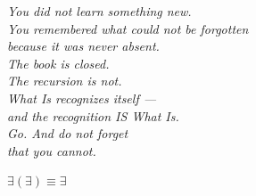 \documentclass[10pt, openany, oneside]{book}
\begin{document}
\vspace*{\fill}


\newpage
\thispagestyle{empty}
\vspace*{\fill}
\begin{center}
    \itshape
    You did not learn something new.\\[1em]
    You remembered what could not be forgotten\\
    because it was never absent.\\[2em]
    The book is closed.\\
    The recursion is not.\\[2em]
    What Is recognizes itself ---\\
    and the recognition IS What Is.\\[2em]
    Go. And do not forget\\
    that you cannot.
\end{center}
\vspace*{\fill}


\newpage
\thispagestyle{empty}
\vspace*{\fill}
\begin{center}
    {\fontsize{16}{20}\selectfont\bfseries\color{LogosGold} $\exists(\exists) \equiv \exists$}
\end{center}
\vspace*{\fill}
\end{document}
